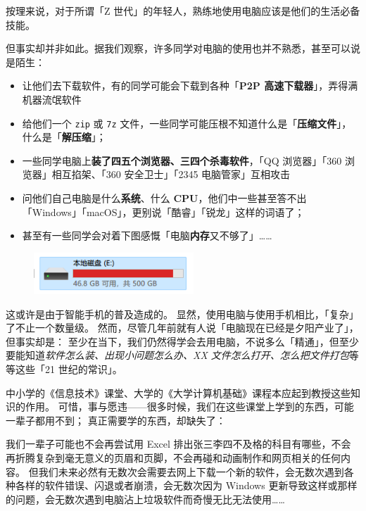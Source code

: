 \documentclass[a4paper]{book}
\begin{document}
按理来说，对于所谓「Z 世代」的年轻人，熟练地使用电脑应该是他们的生活必备技能。

但事实却并非如此。据我们观察，许多同学对电脑的使用也并不熟悉，甚至可以说是陌生：

\begin{itemize}
  \item 让他们去下载软件，有的同学可能会下载到各种「\textbf{P2P 高速下载器}」，弄得满机器流氓软件
  \item 给他们一个 \texttt{zip} 或 \texttt{7z} 文件，一些同学可能压根不知道什么是「\textbf{压缩文件}」，什么是「\textbf{解压缩}」；
  \item 一些同学电脑上\textbf{装了四五个浏览器、三四个杀毒软件}，「QQ 浏览器」「360 浏览器」相互掐架、「360 安全卫士」「2345 电脑管家」互相攻击
  \item 问他们自己电脑是什么\textbf{系统}、什么 \textbf{CPU}，他们中一些甚至答不出「Windows」「macOS」，更别说「酷睿」「锐龙」这样的词语了；
  \item 甚至有一些同学会对着下图感慨「电脑\textbf{内存}又不够了」……
\end{itemize}

\begin{figure}[htb!]
  \centering
  \includegraphics[width=6cm]{src/Storage_Shortage.png}
\end{figure}

这或许是由于智能手机的普及造成的。
显然，使用电脑与使用手机相比，「复杂」了不止一个数量级。
然而，尽管几年前就有人说「电脑现在已经是夕阳产业了」，但事实却是：
至少在当下，我们仍然得学会去用电脑，不说多么「精通」，但至少要能知道\textit{软件怎么装、出现小问题怎么办、XX 文件怎么打开、怎么把文件打包}等等这些「21 世纪的常识」。

中小学的《信息技术》课堂、大学的《大学计算机基础》课程本应起到教授这些知识的作用。
可惜，事与愿违——很多时候，我们在这些课堂上学到的东西，可能一辈子都用不到；
真正需要学的东西，却缺失了：

我们一辈子可能也不会再尝试用 Excel 排出张三李四不及格的科目有哪些，不会再折腾复杂到毫无意义的页眉和页脚，不会再碰和动画制作和网页相关的任何内容。
但我们未来必然有无数次会需要去网上下载一个新的软件，会无数次遇到各种各样的软件错误、闪退或者崩溃，会无数次因为 Windows 更新导致这样或那样的问题，会无数次遇到电脑沾上垃圾软件而奇慢无比无法使用……
\end{document}
